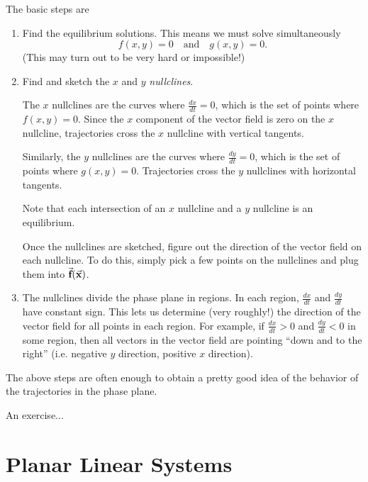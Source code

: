 The basic steps are
\begin{enumerate}
\item Find the equilibrium solutions.
This means we must solve simultaneously
\begin{equation}
    f(x,y) = 0 \quad \textrm{and} \quad g(x,y) =0.
\end{equation}
(This may turn out to be very hard or impossible!)
\item Find and sketch the $x$ and $y$ \emph{nullclines}.

The $x$ nullclines are the curves where $\frac{dx}{dt}=0$, which
is the set of points where $f(x,y)=0$.
Since the $x$ component of the vector field is zero on the
$x$ nullcline, trajectories cross the $x$ nullcline with
vertical tangents.

Similarly, the $y$ nullclines are the curves where
$\frac{dy}{dt} = 0$, which is the set of points where $g(x,y) = 0$.
Trajectories cross the $y$ nullclines with horizontal tangents.

Note that each intersection of an $x$ nullcline and a $y$ nullcline
is an equilibrium.

Once the nullclines are sketched, figure out the direction of the
vector field on each nullcline. To do this, simply pick a few points
on the nullclines and plug them into $\vec{\textbf{f}}(\vec{\textbf{x}})$.

\item
The nullclines divide the phase plane in regions.  In each
region, $\frac{dx}{dt}$ and $\frac{dy}{dt}$ have constant sign.
This lets us determine (very roughly!) the direction of the
vector field for all points in each region.  For example,
if $\frac{dx}{dt} > 0$ and $\frac{dy}{dt} < 0$ in some region,
then all vectors in the vector field are pointing
``down and to the right'' (i.e. negative $y$ direction,
positive $x$ direction).
\end{enumerate}
The above steps are often enough to obtain a
pretty good idea of the behavior of the trajectories
in the phase plane.

\begin{exercises}
\begin{exercise}
An exercise...
\end{exercise}
\end{exercises}
%
%
\newpage

\section{Planar Linear Systems}


